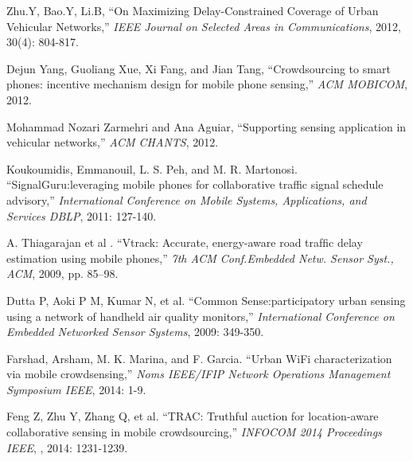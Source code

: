 \documentclass[journal]{IEEEtran}
\begin{document}
%
%
%
\begin{thebibliography}{1}

Zhu.Y, Bao.Y, Li.B, ``On Maximizing Delay-Constrained Coverage of Urban Vehicular Networks,'' \textit{IEEE Journal on Selected Areas in Communications}, 2012, 30(4): 804-817.

Dejun Yang, Guoliang Xue, Xi Fang, and Jian Tang, ``Crowdsourcing to smart phones: incentive mechanism design for mobile phone sensing,''  \textit{ACM MOBICOM}, 2012. 

Mohammad Nozari Zarmehri and Ana Aguiar, ``Supporting sensing application in vehicular networks,'' \textit{ACM CHANTS}, 2012.

Koukoumidis, Emmanouil, L. S. Peh, and M. R. Martonosi. ``SignalGuru:leveraging mobile phones for collaborative traffic signal schedule advisory,'' \textit{International Conference on Mobile Systems, Applications, and Services DBLP}, 2011: 127-140.

A. Thiagarajan et al . ``Vtrack: Accurate, energy-aware road trafﬁc delay estimation using mobile phones,'' \textit{7th ACM Conf.Embedded Netw. Sensor Syst., ACM}, 2009, pp. 85–98.

Dutta P, Aoki P M, Kumar N, et al. ``Common Sense:participatory urban sensing using a network of handheld air quality monitors,'' \textit{International Conference on Embedded Networked Sensor Systems}, 2009: 349-350.

Farshad, Arsham, M. K. Marina, and F. Garcia. ``Urban WiFi characterization via mobile crowdsensing,'' \textit{Noms IEEE/IFIP Network Operations Management Symposium IEEE}, 2014: 1-9.

Feng Z, Zhu Y, Zhang Q, et al. ``TRAC: Truthful auction for location-aware collaborative sensing in mobile crowdsourcing,'' \textit{INFOCOM 2014 Proceedings IEEE}, , 2014: 1231-1239.


\end{thebibliography}
\end{document}
